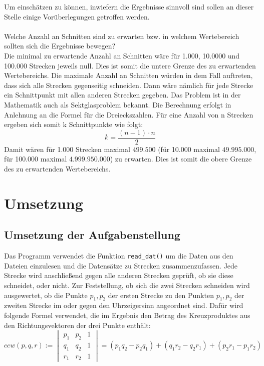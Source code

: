 \documentclass[12pt]{scrartcl}
\newcommand{\code}[1]{\texttt{#1}}
\begin{document}
Um einschätzen zu können, inwiefern die Ergebnisse sinnvoll sind sollen an dieser Stelle einige Vorüberlegungen getroffen werden.\\~\\
Welche Anzahl an Schnitten sind zu erwarten bzw. in welchem Wertebereich sollten sich die Ergebnisse bewegen?\\
Die minimal zu erwartende Anzahl an Schnitten wäre für 1.000, 10.0000 und 100.000 Strecken jeweils null.
Dies ist somit die untere Grenze des zu erwartenden Wertebereichs.
Die maximale Anzahl an Schnitten würden in dem Fall auftreten, dass sich alle Strecken gegenseitig schneiden.
Dann wäre nämlich für jede Strecke ein Schnittpunkt mit allen anderen Strecken gegeben.
Das Problem ist in der Mathematik auch als Sektglasproblem bekannt.
Die Berechnung erfolgt in Anlehnung an die Formel für die Dreieckszahlen.
Für eine Anzahl von n Strecken ergeben sich somit k Schnittpunkte wie folgt:
\begin{equation}
k = \frac{(n-1) \cdot n}{2}
\end{equation}
Damit wären für 1.000 Strecken maximal $499.500$ (für 10.000 maximal $49.995.000$,
für 100.000 maximal $4.999.950.000$) zu erwarten.
Dies ist somit die obere Grenze des zu erwartenden Wertebereichs.


\section{Umsetzung}

\subsection{Umsetzung der Aufgabenstellung}

Das Programm verwendet die Funktion \code{read\_dat()} um die Daten aus den Dateien einzulesen und die Datensätze zu Strecken zusammenzufassen.
Jede Strecke wird anschließend gegen alle anderen Strecken geprüft, ob sie diese schneidet, oder nicht.
Zur Feststellung, ob sich die zwei Strecken schneiden wird ausgewertet, ob die Punkte $p_1, p_2$ der ersten Strecke zu den Punkten $p_1, p_2$ der zweiten Strecke im oder gegen den Uhrzeigersinn angeordnet sind.
Dafür wird folgende Formel verwendet, die im Ergebnis den Betrag des Kreuzproduktes aus den Richtungsvektoren der drei Punkte enthält:
\begin{equation}
    ccw(p, q, r) := \begin{vmatrix} p_1 & p_2 & 1 \\ q_1 & q_2 & 1 \\ r_1 & r_2 & 1 \end{vmatrix} = (p_1q_2 - p_2q_1) + (q_1r_2 - q_2r_1) + (p_2r_1 - p_1r_2)
\end{equation}
\end{document}

